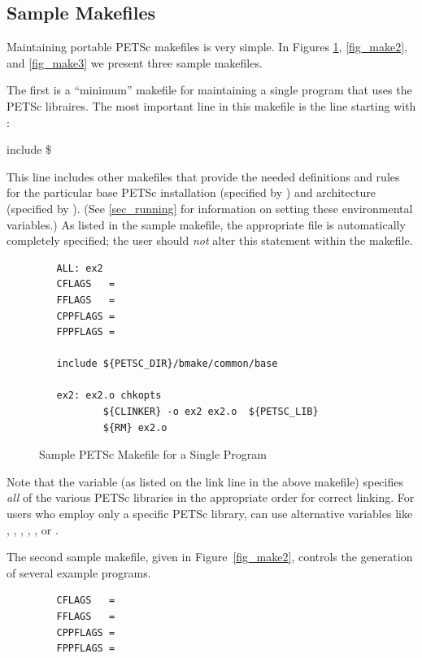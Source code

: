{{{\subsection{Sample Makefiles}

Maintaining portable PETSc makefiles is very simple. In Figures
\ref{fig_make1}, \ref{fig_make2}, and \ref{fig_make3} we present three
sample makefiles.  

The first is a ``minimum'' makefile for maintaining
a single program that uses the PETSc libraires.
The most important line in this makefile is the line starting with :
\begin{tabbing}
   include \$
\end{tabbing}
This line includes other makefiles that provide the needed definitions
and rules for the particular base PETSc installation (specified by
) and architecture (specified by
).  (See \ref{sec_running} for information on
setting these environmental variables.)  As listed in the sample
makefile, the appropriate  file is automatically
completely specified; the user should {\em not} alter this statement
within the makefile.

\begin{figure}[H]
{\small
\begin{verbatim}
   ALL: ex2
   CFLAGS   =
   FFLAGS   =
   CPPFLAGS =
   FPPFLAGS =

   include ${PETSC_DIR}/bmake/common/base

   ex2: ex2.o chkopts
           ${CLINKER} -o ex2 ex2.o  ${PETSC_LIB}
           ${RM} ex2.o
\end{verbatim}
}
\caption{Sample PETSc Makefile for a Single Program}
\label{fig_make1}
\end{figure}


 
Note that the variable  (as listed on the link
line in the above makefile) specifies {\em all} of the various PETSc
libraries in the appropriate order for correct linking.  For users who
employ only a specific PETSc library, can use alternative variables
like  , , 
, ,
,  or
.

The second sample makefile, given in Figure~\ref{fig_make2},
controls the generation of several example programs. 

\begin{figure}[H]
{\small
\begin{verbatim}
   CFLAGS   = 
   FFLAGS   = 
   CPPFLAGS =
   FPPFLAGS =


\end{verbatim}}
\end{figure}}}}
